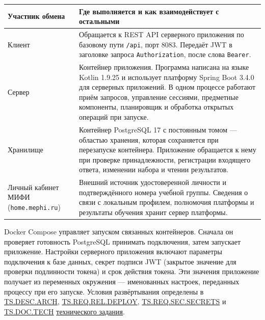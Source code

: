 \documentclass[12pt,a4paper]{article}
\begin{document}
{\def\LTcaptype{none} %
\begin{longtable}[]{@{}
  >{\raggedright\arraybackslash}p{}
  >{\raggedright\arraybackslash}p{}@{}}
\toprule\noalign{}
\begin{minipage}[b]{\linewidth}\raggedright
Участник обмена
\end{minipage} & \begin{minipage}[b]{\linewidth}\raggedright
Где выполняется и как взаимодействует с остальными
\end{minipage} \\
\midrule\noalign{}
\endhead
\bottomrule\noalign{}
\endlastfoot
Клиент & Обращается к REST API серверного приложения по базовому пути \texttt{/api}, порт 8083. Передаёт JWT в заголовке запроса \texttt{Authorization}, после слова \texttt{Bearer}. \\
Сервер & Контейнер приложения. Программа написана на языке Kotlin 1.9.25 и использует платформу Spring Boot 3.4.0 для серверных приложений. В одном процессе работают приём запросов, управление сессиями, предметные компоненты, планировщик и обработка открытых операций при запуске. \\
Хранилище & Контейнер PostgreSQL 17 с постоянным томом --- областью хранения, которая сохраняется при перезапуске контейнера. Приложение обращается к нему при проверке принадлежности, регистрации входящего ответа, изменении набора и чтении результатов. \\
Личный кабинет МИФИ (\texttt{home.\allowbreak{}mephi.\allowbreak{}ru}) & Внешний источник удостоверенной личности и подтверждённого номера учебной группы. Сведения о связи с локальным профилем, полномочия платформы и результаты обучения хранит сервер платформы. \\
\end{longtable}
}

Docker Compose управляет запуском связанных контейнеров. Сначала он проверяет готовность PostgreSQL принимать подключения, затем запускает приложение. Настройки серверного приложения включают параметры подключения к базе данных, секрет подписи JWT (закрытое значение для проверки подлинности токена) и срок действия токена. Эти значения приложение получает из переменных окружения --- именованных настроек, переданных процессу при его запуске. Условия развёртывания определены в {\href{../02\_Техническое\_задание/Техническое\_задание.pdf\#ts-desc-arch}{TS.DESC.ARCH}}, {\href{../02\_Техническое\_задание/Техническое\_задание.pdf\#ts-req-rel-deploy}{TS.REQ.REL.DEPLOY}}, {\href{../02\_Техническое\_задание/Техническое\_задание.pdf\#ts-req-sec-secrets}{TS.REQ.SEC.SECRETS}} и {\href{../02\_Техническое\_задание/Техническое\_задание.pdf\#ts-doc-tech}{TS.DOC.TECH}} {\href{../02\_Техническое\_задание/Техническое\_задание.pdf\#doc-02-техническое-задание}{технического задания}}.
\end{document}
